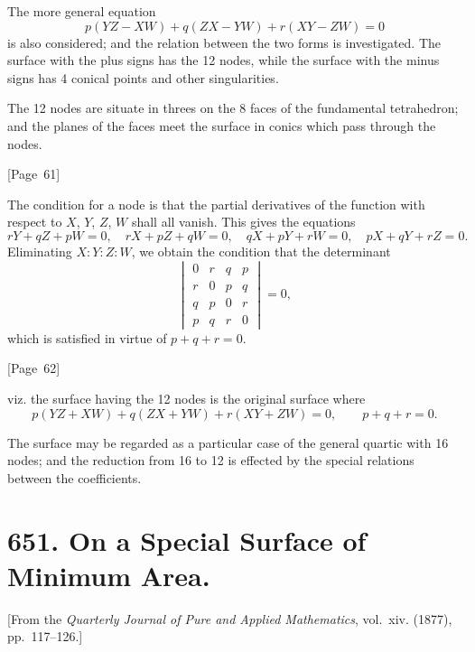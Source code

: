 \documentclass[11pt,a4paper]{article}
\theoremstyle{plain}
\theoremstyle{definition}
\theoremstyle{remark}
\begin{document}
The more general equation
\[
p(YZ - XW) + q(ZX - YW) + r(XY - ZW) = 0
\]
is also considered; and the relation between the two forms is
investigated. The surface with the plus signs has the 12 nodes, while
the surface with the minus signs has 4 conical points and other
singularities.

The 12 nodes are situate in threes on the 8 faces of the fundamental
tetrahedron; and the planes of the faces meet the surface in conics
which pass through the nodes.

\begin{center}
[Page~61]
\end{center}

The condition for a node is that the partial derivatives of the
function with respect to $X$, $Y$, $Z$, $W$ shall all vanish. This
gives the equations
\[
rY + qZ + pW = 0, \quad
rX + pZ + qW = 0, \quad
qX + pY + rW = 0, \quad
pX + qY + rZ = 0.
\]
Eliminating $X : Y : Z : W$, we obtain the condition that the
determinant
\[
\begin{vmatrix}
0 & r & q & p \\
r & 0 & p & q \\
q & p & 0 & r \\
p & q & r & 0
\end{vmatrix} = 0,
\]
which is satisfied in virtue of $p + q + r = 0$.

\begin{center}
[Page~62]
\end{center}

viz. the surface having the 12 nodes is the original surface where
\[
p(YZ + XW) + q(ZX + YW) + r(XY + ZW) = 0, \qquad p + q + r = 0.
\]

The surface may be regarded as a particular case of the general quartic
with 16 nodes; and the reduction from 16 to 12 is effected by the
special relations between the coefficients.


\newpage
\section*{651. On a Special Surface of Minimum Area.}

[From the \textit{Quarterly Journal of Pure and Applied Mathematics},
vol.~xiv. (1877), pp.~117--126.]
\end{document}
